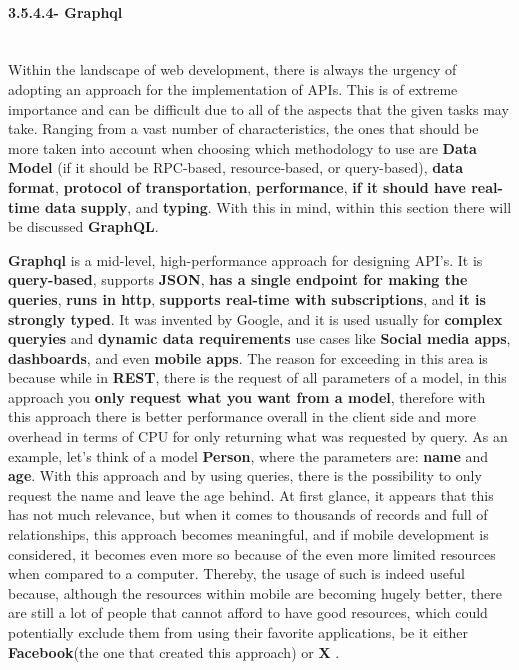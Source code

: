 \paragraph{3.5.4.4- Graphql}\mbox{}\\
Within the landscape of web development, there is always the urgency of adopting an approach for the implementation of APIs. This is of extreme importance and can be difficult due to all of the aspects that the given tasks may take. Ranging from a vast number of characteristics, the ones that should be more taken into account when choosing which methodology to use are \textbf{Data Model} (if it should be RPC-based, resource-based, or query-based), \textbf{data format}, \textbf{protocol of transportation}, \textbf{performance}, \textbf{if it should have real-time data supply}, and \textbf{typing}. With this in mind, within this section there will be discussed \textbf{GraphQL}.

\textbf{Graphql} is a mid-level, high-performance approach for designing API's. It is \textbf{query-based}, supports \textbf{JSON}, \textbf{has a single endpoint for making the queries}, \textbf{runs in http}, \textbf{supports real-time with subscriptions}, and \textbf{it is strongly typed}. It was invented by Google, and it is used usually for \textbf{complex queryies} and \textbf{dynamic data requirements} use cases like \textbf{Social media apps}, \textbf{dashboards}, and even \textbf{mobile apps}. The reason for exceeding in this area is because while in \textbf{REST}, there is the request of all parameters of a model, in this approach you \textbf{only request what you want from a model}, therefore with this approach there is better performance overall in the client side and more overhead in terms of CPU for only returning what was requested by query. As an example, let's think of a model \textbf{Person}, where the parameters are: \textbf{name} and \textbf{age}. With this approach and by using queries, there is the possibility to only request the name and leave the age behind. At first glance, it appears that this has not much relevance, but when it comes to thousands of records and full of relationships, this approach becomes meaningful, and if mobile development is considered, it becomes even more so because of the even more limited resources when compared to a computer. Thereby, the usage of such is indeed useful because, although the resources within mobile are becoming hugely better, there are still a lot of people that cannot afford to have good resources, which could potentially exclude them from using their favorite applications, be it either \textbf{Facebook}(the one that created this approach) or \textbf{X} \cite{graphql}\cite{graphql2}\cite{graphql3}.

